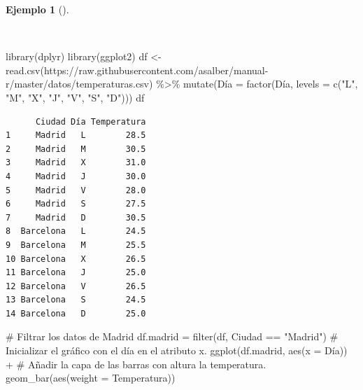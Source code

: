 \documentclass[
  a4paper,
]{scrreport}
\newenvironment{Shaded}{\begin{snugshade}}{\end{snugshade}}
\newcommand{\AttributeTok}[1]{\textcolor[rgb]{0.40,0.45,0.13}{#1}}
\newcommand{\CommentTok}[1]{\textcolor[rgb]{0.37,0.37,0.37}{#1}}
\newcommand{\FunctionTok}[1]{\textcolor[rgb]{0.28,0.35,0.67}{#1}}
\newcommand{\NormalTok}[1]{\textcolor[rgb]{0.00,0.23,0.31}{#1}}
\newcommand{\OtherTok}[1]{\textcolor[rgb]{0.00,0.23,0.31}{#1}}
\newcommand{\SpecialCharTok}[1]{\textcolor[rgb]{0.37,0.37,0.37}{#1}}
\newcommand{\StringTok}[1]{\textcolor[rgb]{0.13,0.47,0.30}{#1}}
\theoremstyle{definition}
\theoremstyle{definition}
\newtheorem{example}{Ejemplo}[chapter]
\theoremstyle{remark}
\begin{document}
\begin{example}[]\protect\hypertarget{exm-barras-1}{}\label{exm-barras-1}

~

\begin{Shaded}
\begin{Highlighting}[]
\FunctionTok{library}\NormalTok{(dplyr)}
\FunctionTok{library}\NormalTok{(ggplot2)}
\NormalTok{df }\OtherTok{\textless{}{-}} \FunctionTok{read.csv}\NormalTok{(}\StringTok{\textquotesingle{}https://raw.githubusercontent.com/asalber/manual{-}r/master/datos/temperaturas.csv\textquotesingle{}}\NormalTok{) }\SpecialCharTok{\%\textgreater{}\%}
    \FunctionTok{mutate}\NormalTok{(Día }\OtherTok{=} \FunctionTok{factor}\NormalTok{(Día, }\AttributeTok{levels =} \FunctionTok{c}\NormalTok{(}\StringTok{"L"}\NormalTok{, }\StringTok{"M"}\NormalTok{, }\StringTok{"X"}\NormalTok{, }\StringTok{"J"}\NormalTok{, }\StringTok{"V"}\NormalTok{, }\StringTok{"S"}\NormalTok{, }\StringTok{"D"}\NormalTok{)))}
\NormalTok{df}
\end{Highlighting}
\end{Shaded}

\begin{verbatim}
      Ciudad Día Temperatura
1     Madrid   L        28.5
2     Madrid   M        30.5
3     Madrid   X        31.0
4     Madrid   J        30.0
5     Madrid   V        28.0
6     Madrid   S        27.5
7     Madrid   D        30.5
8  Barcelona   L        24.5
9  Barcelona   M        25.5
10 Barcelona   X        26.5
11 Barcelona   J        25.0
12 Barcelona   V        26.5
13 Barcelona   S        24.5
14 Barcelona   D        25.0
\end{verbatim}

\begin{Shaded}
\begin{Highlighting}[]
\CommentTok{\# Filtrar los datos de Madrid}
\NormalTok{df.madrid }\OtherTok{=} \FunctionTok{filter}\NormalTok{(df, Ciudad }\SpecialCharTok{==} \StringTok{"Madrid"}\NormalTok{)}
\CommentTok{\# Inicializar el gráfico con el día en el atributo x.}
\FunctionTok{ggplot}\NormalTok{(df.madrid, }\FunctionTok{aes}\NormalTok{(}\AttributeTok{x =}\NormalTok{ Día)) }\SpecialCharTok{+}
\CommentTok{\# Añadir la capa de las barras con altura la temperatura.}
    \FunctionTok{geom\_bar}\NormalTok{(}\FunctionTok{aes}\NormalTok{(}\AttributeTok{weight =}\NormalTok{ Temperatura))}
\end{Highlighting}
\end{Shaded}


\end{example}
\end{document}
